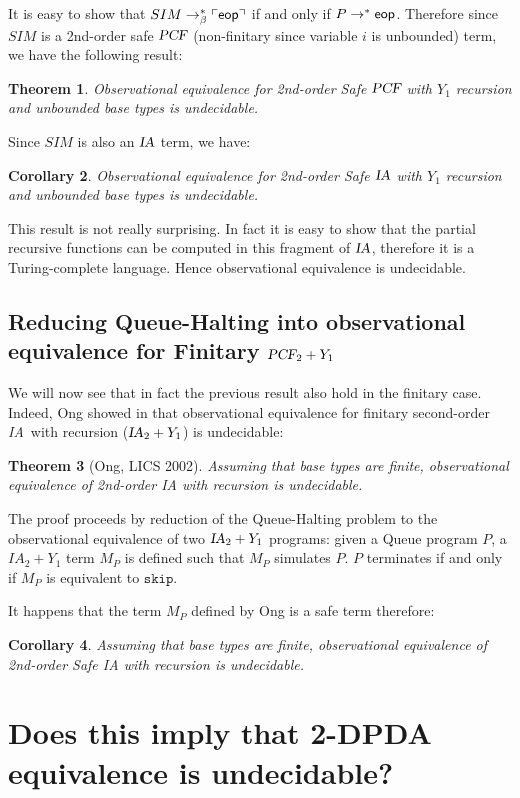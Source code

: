 \documentclass{article}
\newtheorem{theorem}{Theorem}[section]
\newtheorem{corollary}[theorem]{Corollary}
\newcommand{\encode}[1]{\ulcorner #1 \urcorner}
\newcommand\eop{{\sf eop}}
\newcommand{\betared}{\rightarrow_\beta}
\newcommand\ialgol{{\textsl{IA}}}
\newcommand\pcf{\textsl{PCF}}
\newcommand\iaskip{\texttt{skip}}
\begin{document}
It is easy to show that $SIM \betared^* \encode{\eop}$ if and only if $P \rightarrow^* \eop$. Therefore since $SIM$ is a 2nd-order safe $\pcf$ 
(non-finitary since variable $i$ is unbounded) term, we have the following result:
\begin{theorem}
Observational equivalence for 2nd-order Safe $\pcf$ with $Y_1$ recursion and unbounded base types is undecidable.
\end{theorem}
Since $SIM$ is also an $\ialgol$ term, we have:
\begin{corollary}
Observational equivalence for 2nd-order Safe $\ialgol$ with $Y_1$ recursion and unbounded base types is undecidable.
\end{corollary}

This result is not really surprising. In fact it is easy to show that the partial recursive functions can be computed in this fragment of $\ialgol$, therefore it is a Turing-complete language. Hence observational equivalence is undecidable.


\subsection{Reducing Queue-Halting into observational equivalence for Finitary $\pcf_2 + Y_1$}

We will now see that in fact the previous result also hold in the
finitary case. Indeed, Ong showed in \cite{Ong02} that
observational equivalence for finitary second-order \ialgol\ with
recursion ($\ialgol_2 + Y_1$) is undecidable:
\begin{theorem}[Ong, LICS 2002]
Assuming that base types are finite, observational equivalence of 2nd-order IA with recursion is undecidable.
\end{theorem}

The proof proceeds by reduction of the Queue-Halting problem to the
observational equivalence of two $\ialgol_2 + Y_1$ programs: given a
Queue program $P$, a $IA_2 + Y_1$ term $M_P$ is defined such that
$M_P$ simulates $P$. $P$ terminates if and only if $M_P$ is
equivalent to $\iaskip$.

It happens that the term $M_P$ defined by Ong is a safe term
therefore:
\begin{corollary}
Assuming that base types are finite, observational equivalence of 2nd-order Safe IA with recursion is undecidable.
\end{corollary}

\section{Does this imply that 2-DPDA equivalence is undecidable?}
\end{document}
